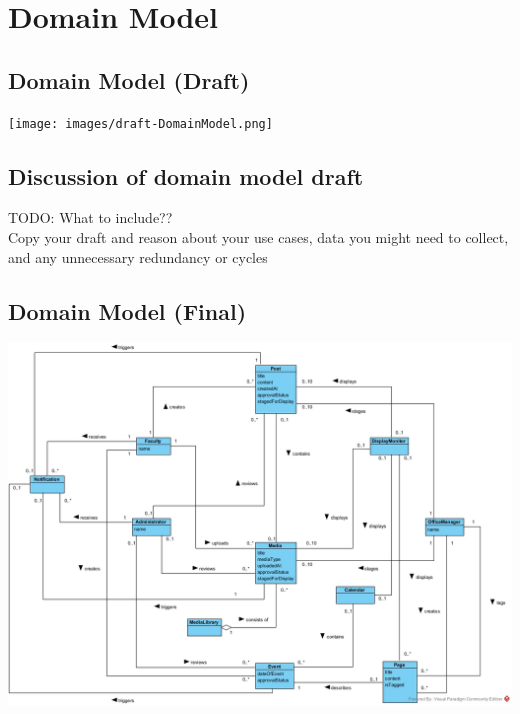 \documentclass{article}
\begin{document}
\section{Domain Model}
    \subsection{Domain Model (Draft)}
        \texttt{[image: images/draft-DomainModel.png]}
        \label{fig:enter-label}

        
    \subsection{Discussion of domain model draft}
    TODO: What to include??\\
    Copy your draft and reason about your use cases, data you might need to collect, and any unnecessary redundancy or cycles

    
    \subsection{Domain Model (Final)}
     \includegraphics[scale=0.45]{images/DomainModel.jpg}
        \label{fig:enter-label}
        
\end{document}
